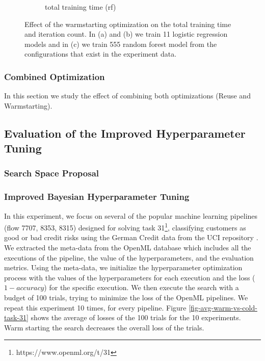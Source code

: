 \begin{figure}
\begin{subfigure}{.5\linewidth}
  \caption{total training time (rf)}
  \label{fig:sub1}
\end{subfigure}
\caption{Effect of the warmstarting optimization on the total training time and iteration count. In (a) and (b) we train 11 logistic regression models and in (c) we train 555 random forest model from the configurations that exist in the experiment data.}
\label{evaluation-warmstarting-figure}
\end{figure}


\subsubsection{Combined Optimization}
In this section we study the effect of combining both optimizations (Reuse and Warmstarting).


\subsection{Evaluation of the Improved Hyperparameter Tuning}
\subsubsection{Search Space Proposal}
\subsubsection{Improved Bayesian Hyperparameter Tuning}
In this experiment, we focus on several of the popular machine learning pipelines (flow 7707, 8353, 8315) designed for solving task 31\footnote{https://www.openml.org/t/31}, classifying customers as good or bad credit risks using the German Credit data from the UCI repository \cite{Dua:2017}.
We extracted the meta-data from the OpenML database which includes all the executions of the pipeline, the value of the hyperparameters, and the evaluation metrics.
Using the meta-data, we initialize the hyperparameter optimization process with the values of the hyperparameters for each execution and the loss ($1- accuracy$) for the specific execution.
We then execute the search with a budget of 100 trials, trying to minimize the loss of the OpenML pipelines.
We repeat this experiment 10 times, for every pipeline.
Figure \ref{fig-avg-warm-vs-cold-task-31} shows the average of losses of the 100 trials for the 10 experiments.
Warm starting the search decreases the overall loss of the trials.

